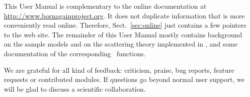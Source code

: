This User Manual is complementary to the online documentation
at \url{http://www.bornagainproject.org}.
It does not duplicate information that is more conveniently read online.
Therefore, Sect.~\ref{sec:online} just contains a few pointers to the web site.
The remainder of this User Manual mostly contains background
on the sample models and on the scattering theory implemented in \BornAgain,
and some documentation of the corresponding \Python\ functions.


We are grateful for all kind of feedback:
criticism, praise, bug reports, feature requests or contributed modules.
If questions go beyond normal user support,
we will be glad to discuss a scientific collaboration.
